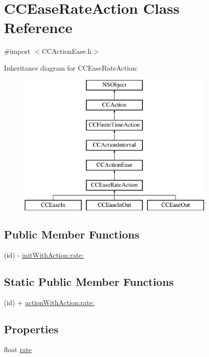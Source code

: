 \hypertarget{interface_c_c_ease_rate_action}{\section{C\-C\-Ease\-Rate\-Action Class Reference}
\label{interface_c_c_ease_rate_action}
}


{\ttfamily \#import $<$C\-C\-Action\-Ease.\-h$>$}

Inheritance diagram for C\-C\-Ease\-Rate\-Action\-:\begin{figure}[H]
\begin{center}
\leavevmode
\includegraphics[height=7.000000cm]{interface_c_c_ease_rate_action}
\end{center}
\end{figure}
\subsection*{Public Member Functions}
\begin{DoxyCompactItemize}
\item 
(id) -\/ \hyperlink{interface_c_c_ease_rate_action_a48bb853d8f9c8e5030c2252014876776}{init\-With\-Action\-:rate\-:}
\end{DoxyCompactItemize}
\subsection*{Static Public Member Functions}
\begin{DoxyCompactItemize}
\item 
(id) + \hyperlink{interface_c_c_ease_rate_action_a8d962f7f67e5dc1db2966a6a5d2f8269}{action\-With\-Action\-:rate\-:}
\end{DoxyCompactItemize}
\subsection*{Properties}
\begin{DoxyCompactItemize}
\item 
float \hyperlink{interface_c_c_ease_rate_action_a65bc459f66b97752751340c9cfed8e74}{rate}
\end{DoxyCompactItemize}


